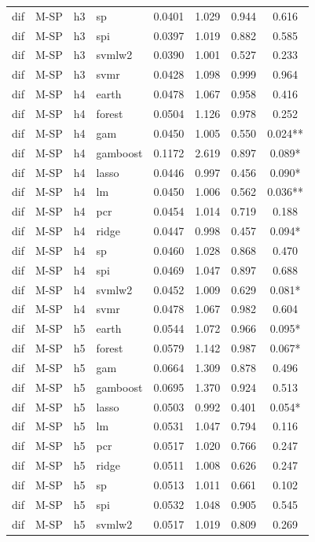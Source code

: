 \begin{ThreePartTable}
\begin{longtable}[t]{llclcccc}
dif & M-SP & h3 & sp & 0.0401 & 1.029 & 0.944 & 0.616\\
dif & M-SP & h3 & spi & 0.0397 & 1.019 & 0.882 & 0.585\\
dif & M-SP & h3 & svmlw2 & 0.0390 & 1.001 & 0.527 & 0.233\\
dif & M-SP & h3 & svmr & 0.0428 & 1.098 & 0.999 & 0.964\\
\addlinespace
dif & M-SP & h4 & earth & 0.0478 & 1.067 & 0.958 & 0.416\\
dif & M-SP & h4 & forest & 0.0504 & 1.126 & 0.978 & 0.252\\
dif & M-SP & h4 & gam & 0.0450 & 1.005 & 0.550 & 0.024**\\
dif & M-SP & h4 & gamboost & 0.1172 & 2.619 & 0.897 & 0.089*\\
dif & M-SP & h4 & lasso & 0.0446 & 0.997 & 0.456 & 0.090*\\
dif & M-SP & h4 & lm & 0.0450 & 1.006 & 0.562 & 0.036**\\
dif & M-SP & h4 & pcr & 0.0454 & 1.014 & 0.719 & 0.188\\
dif & M-SP & h4 & ridge & 0.0447 & 0.998 & 0.457 & 0.094*\\
dif & M-SP & h4 & sp & 0.0460 & 1.028 & 0.868 & 0.470\\
dif & M-SP & h4 & spi & 0.0469 & 1.047 & 0.897 & 0.688\\
dif & M-SP & h4 & svmlw2 & 0.0452 & 1.009 & 0.629 & 0.081*\\
dif & M-SP & h4 & svmr & 0.0478 & 1.067 & 0.982 & 0.604\\
\addlinespace
dif & M-SP & h5 & earth & 0.0544 & 1.072 & 0.966 & 0.095*\\
dif & M-SP & h5 & forest & 0.0579 & 1.142 & 0.987 & 0.067*\\
dif & M-SP & h5 & gam & 0.0664 & 1.309 & 0.878 & 0.496\\
dif & M-SP & h5 & gamboost & 0.0695 & 1.370 & 0.924 & 0.513\\
dif & M-SP & h5 & lasso & 0.0503 & 0.992 & 0.401 & 0.054*\\
dif & M-SP & h5 & lm & 0.0531 & 1.047 & 0.794 & 0.116\\
dif & M-SP & h5 & pcr & 0.0517 & 1.020 & 0.766 & 0.247\\
dif & M-SP & h5 & ridge & 0.0511 & 1.008 & 0.626 & 0.247\\
dif & M-SP & h5 & sp & 0.0513 & 1.011 & 0.661 & 0.102\\
dif & M-SP & h5 & spi & 0.0532 & 1.048 & 0.905 & 0.545\\
dif & M-SP & h5 & svmlw2 & 0.0517 & 1.019 & 0.809 & 0.269\\

\end{longtable}
\end{ThreePartTable}
